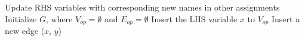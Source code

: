\begin{itemize}
\begin{algorithm}[ht!]
\begin{algorithmic}[1]
                \State      Update RHS variables with corresponding new names in other assignments
                \EndFor                                                     \label{line:forhsaile}
            \State      Initialize $G \textrm{, where } V_{op} = \emptyset \textrm{ and } E_{op} = \emptyset $
             \label{line:forssas}    
                \State      Insert the LHS variable $x$ to $V_{op}$
                    \State      Insert a new edge ($x$, $y$)
                \EndFor
            \EndFor                                                         \label{line:forssae}
        \end{algorithmic}
        \label{alg:2dfg}
        \end{algorithm}


\end{itemize}
